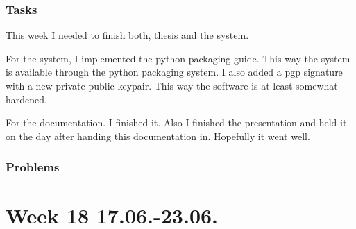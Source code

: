 \subsubsection{Tasks}

This week I needed to finish both, thesis and the system.

For the system, I implemented the python packaging guide. This way the system is available through the python packaging system. I also added a \gls{pgp} signature with a new private public keypair. This way the software is at least somewhat hardened. 

For the documentation. I finished it. Also I finished the presentation and held it on the day after handing this documentation in. Hopefully it went well.

\subsubsection{Problems}


\section{Week 18 17.06.-23.06.}
\label{sec:journal:week18}

